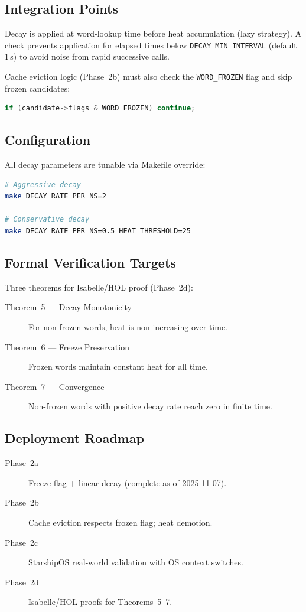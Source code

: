 \subsection{Integration Points}

Decay is applied at word-lookup time before heat accumulation (lazy strategy).
A check prevents application for elapsed times below \texttt{DECAY\_MIN\_INTERVAL}
(default 1\,\textmu{}s) to avoid noise from rapid successive calls.

Cache eviction logic (Phase~2b) must also check the \texttt{WORD\_FROZEN}
flag and skip frozen candidates:

\begin{lstlisting}[language=C]
if (candidate->flags & WORD_FROZEN) continue;
\end{lstlisting}

\subsection{Configuration}

All decay parameters are tunable via Makefile override:

\begin{lstlisting}[language=bash]
# Aggressive decay
make DECAY_RATE_PER_NS=2

# Conservative decay
make DECAY_RATE_PER_NS=0.5 HEAT_THRESHOLD=25
\end{lstlisting}

\subsection{Formal Verification Targets}

Three theorems for Isabelle/HOL proof (Phase~2d):

\begin{description}
  \item[Theorem~5 — Decay Monotonicity]
    For non-frozen words, heat is non-increasing over time.
  \item[Theorem~6 — Freeze Preservation]
    Frozen words maintain constant heat for all time.
  \item[Theorem~7 — Convergence]
    Non-frozen words with positive decay rate reach zero in finite time.
\end{description}

\subsection{Deployment Roadmap}

\begin{description}
  \item[Phase~2a] Freeze flag + linear decay (complete as of 2025-11-07).
  \item[Phase~2b] Cache eviction respects frozen flag; heat demotion.
  \item[Phase~2c] StarshipOS real-world validation with OS context switches.
  \item[Phase~2d] Isabelle/HOL proofs for Theorems~5--7.
\end{description}
